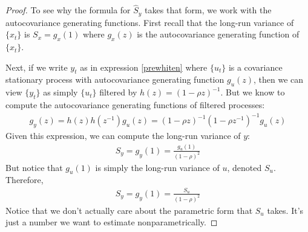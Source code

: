 \documentclass[12pt]{article}
\theoremstyle{plain}
\theoremstyle{definition}
\theoremstyle{remark}
\begin{document}
\begin{proof}
To see why the formula for $\hat{S}_y$ takes that form, we work with the
autocovariance generating functions. First recall that the long-run
variance of $\{x_t\}$ is $S_x=g_x(1)$ where $g_x(z)$ is the
autocovariance generating function of $\{x_t\}$.

Next, if we write $y_t$ as in expression \ref{prewhiten} where $\{u_t\}$
is a covariance stationary process with autocovariance generating
function $g_u(z)$, then we can view $\{y_t\}$ as simply $\{u_t\}$
filtered by $h(z)=(1-\rho z)^{-1}$. But we know to compute the
autocovariance generating functions of filtered processes:
\begin{align*}
  g_y(z) = h(z)h(z^{-1}) g_u(z)
  = (1-\rho z)^{-1}(1-\rho z^{-1})^{-1}g_u(z)
\end{align*}
Given this expression, we can compute the long-run variance of $y$:
\begin{align*}
  S_y = g_y(1) = \frac{g_u(1)}{(1-\rho)^{2}}
\end{align*}
But notice that $g_u(1)$ is simply the long-run variance of $u$, denoted
$S_u$.  Therefore,
\begin{align*}
  S_y = g_y(1) = \frac{S_u}{(1-\rho)^{2}}
\end{align*}
Notice that we don't actually care about the parametric form that $S_u$
takes. It's just a number we want to estimate nonparametrically.
\end{proof}
\end{document}
